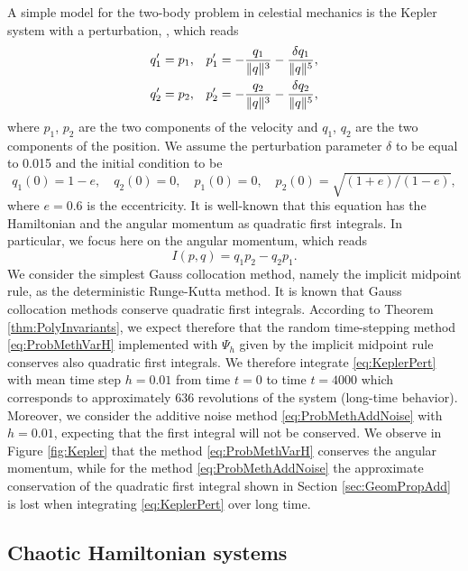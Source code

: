 \documentclass{siamart1116}
\numberwithin{theorem}{section}
\DeclarePairedDelimiter{\norm}{\|}{\|}
\begin{document}
A simple model for the two-body problem in celestial mechanics is the Kepler system with a perturbation, , which reads
\begin{equation}\label{eq:KeplerPert}
\begin{aligned}
	q_1' &= p_1, && p_1' = -\frac{q_1}{\norm{q}^3} - \frac{\delta q_1}{\norm{q}^5}, \\
	q_2' &= p_2, && p_2' = -\frac{q_2}{\norm{q}^3} - \frac{\delta q_2}{\norm{q}^5},
\end{aligned}
\end{equation}
where $p_1$, $p_2$ are the two components of the velocity and $q_1$, $q_2$ are the two components of the position. We assume the perturbation parameter $\delta$ to be equal to 0.015 and the initial condition to be
\begin{equation}
	q_1(0) = 1 − e,\quad q_2(0) = 0, \quad p_1(0) = 0, \quad p_2(0) = \sqrt{(1 + e)/(1 − e)},
\end{equation}
where $e = 0.6$ is the eccentricity. It is well-known that this equation has the Hamiltonian and the angular momentum as quadratic first integrals. In particular, we focus here on the angular momentum, which reads
\begin{equation}
	I(p, q) = q_1p_2 - q_2p_1.
\end{equation}
We consider the simplest Gauss collocation method, namely the implicit midpoint rule, as the deterministic Runge-Kutta method. It is known that Gauss collocation methods conserve quadratic first integrals. According to Theorem \ref{thm:PolyInvariants}, we expect therefore that the random time-stepping method \eqref{eq:ProbMethVarH} implemented with $\Psi_h$ given by the implicit midpoint rule conserves also quadratic first integrals. We therefore integrate \eqref{eq:KeplerPert} with mean time step $h = 0.01$ from time $t = 0$ to time $t = 4000$ which corresponds to approximately $636$ revolutions of the system (long-time behavior). Moreover, we consider the additive noise method \eqref{eq:ProbMethAddNoise} with $h = 0.01$, expecting that the first integral will not be conserved. We observe in Figure \ref{fig:Kepler} that the method \eqref{eq:ProbMethVarH} conserves the angular momentum, while for the method \eqref{eq:ProbMethAddNoise} the approximate conservation of the quadratic first integral shown in Section \ref{sec:GeomPropAdd} is lost when integrating \eqref{eq:KeplerPert} over long time.

\subsection{Chaotic Hamiltonian systems}
\end{document}
